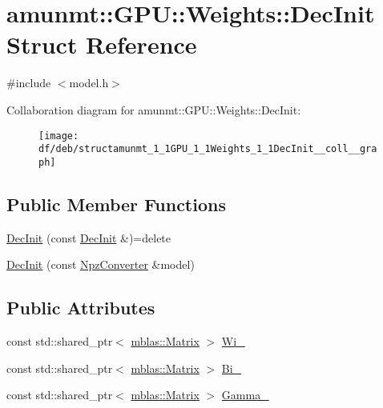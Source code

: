 \hypertarget{structamunmt_1_1GPU_1_1Weights_1_1DecInit}{}\section{amunmt\+:\+:G\+PU\+:\+:Weights\+:\+:Dec\+Init Struct Reference}
\label{structamunmt_1_1GPU_1_1Weights_1_1DecInit}


{\ttfamily \#include $<$model.\+h$>$}



Collaboration diagram for amunmt\+:\+:G\+PU\+:\+:Weights\+:\+:Dec\+Init\+:
\nopagebreak
\begin{figure}[H]
\begin{center}
\leavevmode
\texttt{[image: df/deb/structamunmt\_1\_1GPU\_1\_1Weights\_1\_1DecInit\_\_coll\_\_graph]}
\end{center}
\end{figure}
\subsection*{Public Member Functions}
\begin{DoxyCompactItemize}
\item 
\hyperlink{structamunmt_1_1GPU_1_1Weights_1_1DecInit_aa6e7e816545d971d3a1a6a166a871047}{Dec\+Init} (const \hyperlink{structamunmt_1_1GPU_1_1Weights_1_1DecInit}{Dec\+Init} \&)=delete
\item 
\hyperlink{structamunmt_1_1GPU_1_1Weights_1_1DecInit_a8fefe1357ef9e0a8d0930ee005b14ed4}{Dec\+Init} (const \hyperlink{classamunmt_1_1GPU_1_1NpzConverter}{Npz\+Converter} \&model)
\end{DoxyCompactItemize}
\subsection*{Public Attributes}
\begin{DoxyCompactItemize}
\item 
const std\+::shared\+\_\+ptr$<$ \hyperlink{namespaceamunmt_1_1GPU_1_1mblas_ab67821a8254de53e45a623cf73c0aef6}{mblas\+::\+Matrix} $>$ \hyperlink{structamunmt_1_1GPU_1_1Weights_1_1DecInit_a5b347c65f13d8b61168770d2a3cfd439}{Wi\+\_\+}
\item 
const std\+::shared\+\_\+ptr$<$ \hyperlink{namespaceamunmt_1_1GPU_1_1mblas_ab67821a8254de53e45a623cf73c0aef6}{mblas\+::\+Matrix} $>$ \hyperlink{structamunmt_1_1GPU_1_1Weights_1_1DecInit_a65840111f29600e8d27d794e2ba652f3}{Bi\+\_\+}
\item 
const std\+::shared\+\_\+ptr$<$ \hyperlink{namespaceamunmt_1_1GPU_1_1mblas_ab67821a8254de53e45a623cf73c0aef6}{mblas\+::\+Matrix} $>$ \hyperlink{structamunmt_1_1GPU_1_1Weights_1_1DecInit_a517c78e4b2646a5c9699c157d7769c4f}{Gamma\+\_\+}
\end{DoxyCompactItemize}


